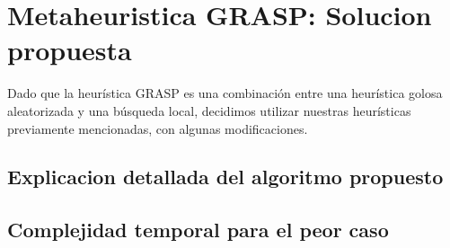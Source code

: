 \section{Metaheuristica GRASP: Solucion propuesta}

Dado que la heur\'istica GRASP es una combinaci\'on entre una heur\'istica golosa aleatorizada y una b\'usqueda local, decidimos utilizar nuestras heur\'isticas previamente mencionadas, con algunas modificaciones.

\vspace{2mm}



\subsection{Explicacion detallada del algoritmo propuesto}


\subsection{Complejidad temporal para el peor caso}
